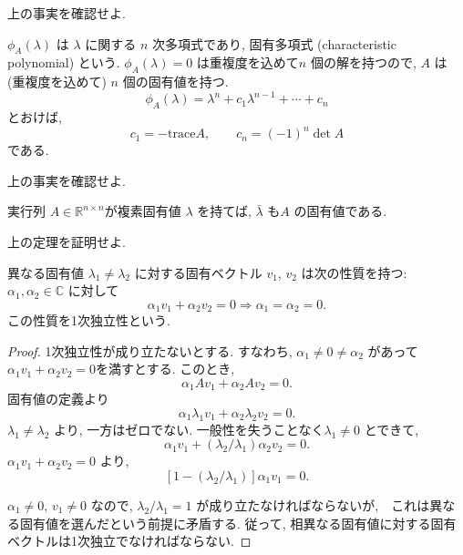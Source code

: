 \documentclass[a4paper]{scrbook}
\theoremstyle{definition}
\let\BeginKnitrBlock\begin \let\EndKnitrBlock\end
\begin{document}
\BeginKnitrBlock{exercise}
上の事実を確認せよ.
\EndKnitrBlock{exercise}

\(\phi_{A}(\lambda)\) は \(\lambda\) に関する \(n\) 次多項式であり,
固有多項式 (characteristic polynomial) という. \(\phi_{A}(\lambda)=0\)
は重複度を込めて\(n\) 個の解を持つので, \(A\) は (重複度を込めて) \(n\)
個の固有値を持つ. \[
  \phi_{A}(\lambda)=\lambda^{n}+c_{1}\lambda^{n-1}+\cdots+c_{n}
\] とおけば, \[
  c_{1}=-\mathrm{trace}A,\qquad c_{n}=(-1)^{n}\det A
\] である.

\BeginKnitrBlock{exercise}
上の事実を確認せよ.
\EndKnitrBlock{exercise}

\BeginKnitrBlock{theorem}
\protect\hypertarget{thm:unnamed-chunk-57}{}{\label{thm:unnamed-chunk-57}}実行列
\(A\in\mathbb{R}^{n\times n}\)が複素固有値 \(\lambda\) を持てば,
\(\bar{\lambda}\) も\(A\) の固有値である.
\EndKnitrBlock{theorem}

\BeginKnitrBlock{exercise}
上の定理を証明せよ.
\EndKnitrBlock{exercise}

\BeginKnitrBlock{theorem}
\protect\hypertarget{thm:unnamed-chunk-59}{}{\label{thm:unnamed-chunk-59}}異なる固有値
\(\lambda_{1}\neq\lambda_{2}\) に対する固有ベクトル \(v_{1}\), \(v_{2}\)
は次の性質を持つ: \(\alpha_{1},\alpha_{2}\in\mathbb{C}\) に対して \[
  \alpha_{1}v_{1}+\alpha_{2}v_{2}=0\Rightarrow\alpha_{1}=\alpha_{2}=0.
\] この性質を1次独立性という.
\EndKnitrBlock{theorem}

\BeginKnitrBlock{proof}
\iffalse {証明. } \fi   1次独立性が成り立たないとする. すなわち,
\(\alpha_{1}\neq0\neq\alpha_{2}\) があって
\(\alpha_{1}v_{1}+\alpha_{2}v_{2}=0\)を満すとする. このとき, \[
    \alpha_{1}Av_{1}+\alpha_{2}Av_{2}=0.
  \] 固有値の定義より \[
    \alpha_{1}\lambda_{1}v_{1}+\alpha_{2}\lambda_{2}v_{2}=0.
  \] \(\lambda_{1}\neq\lambda_{2}\) より, 一方はゼロでない.
一般性を失うことなく\(\lambda_{1}\neq0\) とできて, \[
    \alpha_{1}v_{1}+(\lambda_{2}/\lambda_{1})\alpha_{2}v_{2}=0.
  \] \(\alpha_1 v_1 + \alpha_2 v_2 = 0\) より, \[
    \left[
      1 - (\lambda_{2}/\lambda_{1})
    \right] \alpha_{1}v_{1}=0.
  \]

\(\alpha_{1}\neq0\), \(v_{1}\neq0\) なので,
\(\lambda_{2}/\lambda_{1}=1\)
が成り立たなければならないが,　これは異なる固有値を選んだという前提に矛盾する.
従って, 相異なる固有値に対する固有ベクトルは1次独立でなければならない.
\EndKnitrBlock{proof}


\end{document}
